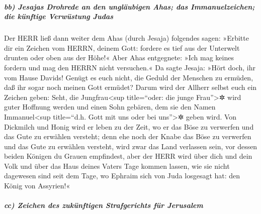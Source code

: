 \hypertarget{bb-jesajas-drohrede-an-den-ungluxe4ubigen-ahas-das-immanuelzeichen-die-kuxfcnftige-verwuxfcstung-judas}{%
\subparagraph{bb) Jesajas Drohrede an den ungläubigen Ahas; das
Immanuelzeichen; die künftige Verwüstung
Judas}\label{bb-jesajas-drohrede-an-den-ungluxe4ubigen-ahas-das-immanuelzeichen-die-kuxfcnftige-verwuxfcstung-judas}}

Der HERR ließ dann weiter dem Ahas (durch Jesaja)
folgendes sagen: »Erbitte dir ein Zeichen vom HERRN,
deinem Gott: fordere es tief aus der Unterwelt drunten oder oben aus der
Höhe!« Aber Ahas entgegnete: »Ich mag keines fordern und
mag den HERRN nicht versuchen.« Da sagte Jesaja: »Hört
doch, ihr vom Hause Davids! Genügt es euch nicht, die Geduld der
Menschen zu ermüden, daß ihr sogar noch meinen Gott ermüdet?
Darum wird der Allherr selbst euch ein Zeichen geben:
Seht, die Jungfrau\textless sup title=``oder: die junge
Frau''\textgreater✲ wird guter Hoffnung werden und einen Sohn gebären,
dem sie den Namen Immanuel\textless sup title=``d.h. Gott mit uns oder
bei uns''\textgreater✲ geben wird. Von Dickmilch und
Honig wird er leben zu der Zeit, wo er das Böse zu verwerfen und das
Gute zu erwählen versteht; denn ehe noch der Knabe das
Böse zu verwerfen und das Gute zu erwählen versteht, wird zwar das Land
verlassen sein, vor dessen beiden Königen du Grauen empfindest,
aber der HERR wird über dich und dein Volk und über das
Haus deines Vaters Tage kommen lassen, wie sie nicht dagewesen sind seit
dem Tage, wo Ephraim sich von Juda losgesagt hat: den König von
Assyrien!«

\hypertarget{cc-zeichen-des-zukuxfcnftigen-strafgerichts-fuxfcr-jerusalem}{%
\subparagraph{cc) Zeichen des zukünftigen Strafgerichts für
Jerusalem}\label{cc-zeichen-des-zukuxfcnftigen-strafgerichts-fuxfcr-jerusalem}}

